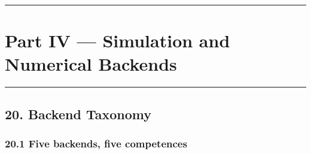 \documentclass[
  11pt]{report}
\begin{document}
\begin{center}\rule{0.5\linewidth}{0.5pt}\end{center}

\hypertarget{part-iv-simulation-and-numerical-backends}{%
\part{Part IV --- Simulation and Numerical
Backends}\label{part-iv-simulation-and-numerical-backends}}

\begin{center}\rule{0.5\linewidth}{0.5pt}\end{center}

\hypertarget{backend-taxonomy}{%
\chapter{20. Backend Taxonomy}\label{backend-taxonomy}}

\hypertarget{five-backends-five-competences}{%
\section{20.1 Five backends, five
competences}\label{five-backends-five-competences}}
\end{document}
